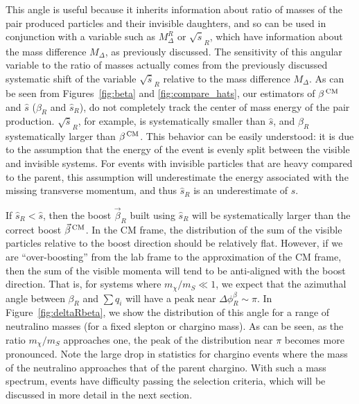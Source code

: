 This angle is useful because it inherits information about ratio of masses of the pair produced particles and their invisible daughters, and so can be used in conjunction with a variable such as $M_\Delta^R$ or $\sqrt{\hat{s}}_R$, which have information about the mass difference $M_\Delta$, as previously discussed. The sensitivity of this angular variable to the ratio of masses actually comes from the previously discussed systematic shift of the variable $\sqrt{\hat{s}}_R$ relative to the mass difference $M_\Delta$. As can be seen from Figures~\ref{fig:beta} and \ref{fig:compare_hats}, our estimators of $\beta^{\,\rm CM}$ and $\hat{s}$ ($\beta_R$ and $\hat{s}_R$), do not completely track the center of mass energy of the pair production. $\sqrt{\hat{s}}_R$, for example, is systematically smaller than $\hat{s}$, and $\beta_R$ systematically larger than $\beta^{\, \rm CM}$. This behavior can be easily understood: it is due to the assumption that the energy of the event is evenly split between the visible and invisible systems. For events with invisible particles that are heavy compared to the parent, this assumption will underestimate the energy associated with the missing transverse momentum, and thus $\hat{s}_R$ is an underestimate of $\hat{s}$.

If $\hat{s}_R < \hat{s}$, then the boost $\vec{\beta}_R$ built using $\hat{s}_R$ will be systematically larger than the correct boost $\vec{\beta}^{\, \rm CM}$. In the CM frame, the distribution of the sum of the visible particles relative to the boost direction should be relatively flat. However, if we are ``over-boosting'' from the lab frame to the approximation of the CM frame, then the sum of the visible momenta will tend to be anti-aligned with the boost direction. That is, for systems where $m_\chi/m_S \ll 1$, we expect that the azimuthal angle between $\beta_R$ and $\sum q_i$ will have a peak near $\Delta\phi_R^{\beta} \sim \pi$. In Figure~\ref{fig:deltaRbeta}, we show the distribution of this angle for a range of neutralino masses (for a fixed slepton or chargino mass). As can be seen, as the ratio $m_\chi/m_S$ approaches one, the peak of the distribution near $\pi$ becomes more pronounced. Note the large drop in statistics for chargino events where the mass of the neutralino approaches that of the parent chargino. With such a mass spectrum, events have difficulty passing the selection criteria, which will be discussed in more detail in the next section. 

